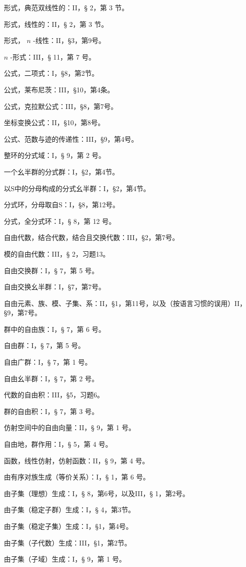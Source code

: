 形式，典范双线性的：II，§ 2，第 3 节。

形式，线性的：II，§ 2，第 3 节。

形式， \(n\) -线性：II，§3，第9号。

\(n\) -形式：III，§ 11，第 7 号。

公式，二项式：I，§8，第2节。

公式，莱布尼茨：III，§10，第4条。

公式，克拉默公式：III，§8，第7号。

坐标变换公式：II，§10，第8号。

公式、范数与迹的传递性：III，§9，第4号。

整环的分式域：I，§ 9，第 2 号。

一个幺半群的分式群：I，§2，第4节。

以S中的分母构成的分式幺半群：I，§2，第4节。

分式环，分母取自S：I，§8，第12号。

分式，全分式环：I，§ 8，第 12 号。

自由代数，结合代数，结合且交换代数：III，§2，第7号。

模的自由代数：III，§ 2，习题13。

自由交换群：I，§ 7，第 5 号。

自由交换幺半群：I，§7，第7号。

自由元素、族、模、子集、系：II，§1，第11号，以及（按语言习惯的误用）II，§9，第7号。

群中的自由族：I，§ 7，第 6 号。

自由群：I，§ 7，第 5 号。

自由广群：I，§ 7，第 1 号。

自由幺半群：I，§ 7，第 2 号。

代数的自由积：III，§5，习题6。

群的自由积：I，§ 7，第 3 号。

仿射空间中的自由向量：II，§ 9，第 1 号。

自由地，群作用：I，§ 5，第 4 号。

函数，线性仿射，仿射函数：II，§ 9，第 4 号。

由有序对族生成（等价关系）：I，§ 1，第 6 号。

由子集（理想）生成：I，§ 8，第6号，以及III，§ 1，第2号。

由子集（稳定子群）生成：I，§ 4，第3节。

由子集（稳定子集）生成：I，§1，第4号。

由子集（子代数）生成：III，§1，第2节。

由子集（子域）生成：I，§ 9，第 1 号。

